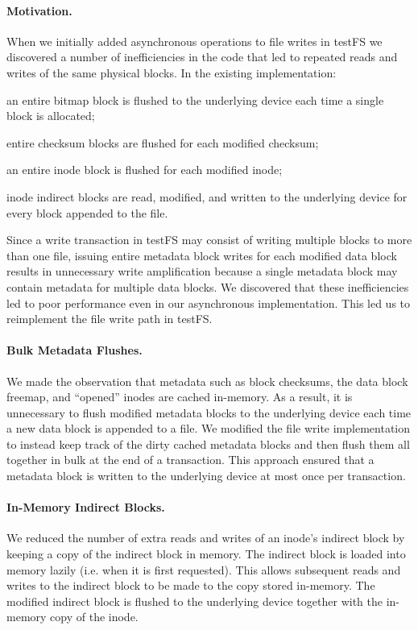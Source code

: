 \paragraph{Motivation.}
When we initially added asynchronous operations to file writes in testFS we
discovered a number of inefficiencies in the code that led to repeated reads
and writes of the same physical blocks. In the existing implementation:
\begin{enumerate*}[label={(\roman*)}]
  \item an entire bitmap block is flushed to the underlying device each time a
    single block is allocated;
  \item entire checksum blocks are flushed for each modified checksum;
  \item an entire inode block is flushed for each modified inode;
  \item inode indirect blocks are read, modified, and written to the underlying
    device for every block appended to the file.
\end{enumerate*}
Since a write transaction in testFS may consist of writing multiple blocks to
more than one file, issuing entire metadata block writes for each modified data
block results in unnecessary write amplification because a single metadata
block may contain metadata for multiple data blocks. We discovered that these
inefficiencies led to poor performance even in our asynchronous implementation.
This led us to reimplement the file write path in testFS.

\paragraph{Bulk Metadata Flushes.}
We made the observation that metadata such as block checksums, the data
block freemap, and ``opened'' inodes are cached in-memory. As a result, it is
unnecessary to flush modified metadata blocks to the underlying device each
time a new data block is appended to a file. We modified the file write
implementation to instead keep track of the dirty cached metadata blocks and
then flush them all together in bulk at the end of a transaction. This approach
ensured that a metadata block is written to the underlying device at most once
per transaction.

\paragraph{In-Memory Indirect Blocks.}
We reduced the number of extra reads and writes of an inode's indirect block by
keeping a copy of the indirect block in memory. The indirect block is loaded
into memory lazily (i.e. when it is first requested). This allows subsequent
reads and writes to the indirect block to be made to the copy stored in-memory.
The modified indirect block is flushed to the underlying device together with
the in-memory copy of the inode.
